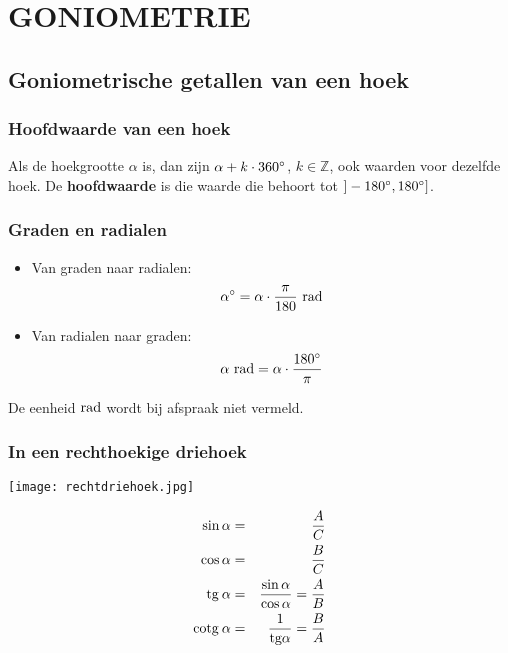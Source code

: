 \section{GONIOMETRIE} \label{goniometrie}
\hypertarget{goniometrie}{}

\subsection{Goniometrische getallen van een hoek} \label{goniometrische_getallen}
\hypertarget{goniometrische_getallen}{}

\subsubsection{Hoofdwaarde van een hoek} \label{hoofdwaarde_hoek}

Als de hoekgrootte $\alpha$ is, dan zijn $\alpha + k\cdot 360^\circ$, $k\in \mathbb{Z}$, ook waarden voor dezelfde hoek. De {\bf hoofdwaarde} is die waarde die behoort tot $]-180^\circ,180^\circ]$.

\subsubsection{Graden en radialen} \label{graden_radialen}

\begin{itemize}
  \item Van graden naar radialen:
  $$\alpha^\circ = \alpha\cdot\frac{\pi}{180}\mbox{ rad}$$
  \item Van radialen naar graden:
  $$\alpha \mbox{ rad} = \alpha\cdot\frac{180^\circ}{\pi}$$
\end{itemize}
De eenheid$\mbox{ rad}$ wordt bij afspraak niet vermeld.

\subsubsection{In een rechthoekige driehoek} \label{rechthoekige_driehoek}
\hypertarget{rechthoekige_driehoek}{}

\begin{center}
\texttt{[image: rechtdriehoek.jpg]}
\end{center}
\begin{eqnarray*}
\sin\alpha&=&\displaystyle\frac{\displaystyle A}{\displaystyle C}\\
\cos\alpha&=&\displaystyle\frac{\displaystyle B}{\displaystyle C}\\
\mbox{tg}\:\alpha&=&\displaystyle\frac{\displaystyle \sin\alpha}{\displaystyle \cos\alpha}=\displaystyle\frac{\displaystyle A}{\displaystyle B}\\
\mbox{cotg}\:\alpha&=&\displaystyle\frac{\displaystyle 1}{\displaystyle \mbox{tg}\alpha}=\displaystyle\frac{\displaystyle B}{\displaystyle A}
\end{eqnarray*}

